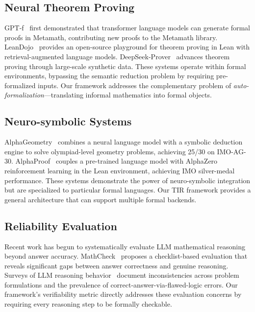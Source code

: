 \documentclass[11pt,a4paper]{article}
\begin{document}
\subsection{Neural Theorem Proving}

GPT-f~\cite{polu2020generative} first demonstrated that transformer language models can generate formal proofs in Metamath, contributing new proofs to the Metamath library. LeanDojo~\cite{yang2023leandojo} provides an open-source playground for theorem proving in Lean with retrieval-augmented language models. DeepSeek-Prover~\cite{deepseek2024prover} advances theorem proving through large-scale synthetic data. These systems operate within formal environments, bypassing the semantic reduction problem by requiring pre-formalized inputs. Our framework addresses the complementary problem of \textit{auto-formalization}---translating informal mathematics into formal objects.

\subsection{Neuro-symbolic Systems}

AlphaGeometry~\cite{trinh2024solving} combines a neural language model with a symbolic deduction engine to solve olympiad-level geometry problems, achieving 25/30 on IMO-AG-30. AlphaProof~\cite{hubert2025alphaproof} couples a pre-trained language model with AlphaZero reinforcement learning in the Lean environment, achieving IMO silver-medal performance. These systems demonstrate the power of neuro-symbolic integration but are specialized to particular formal languages. Our TIR framework provides a general architecture that can support multiple formal backends.

\subsection{Reliability Evaluation}

Recent work has begun to systematically evaluate LLM mathematical reasoning beyond answer accuracy. MathCheck~\cite{liang2024mathcheck} proposes a checklist-based evaluation that reveals significant gaps between answer correctness and genuine reasoning. Surveys of LLM reasoning behavior~\cite{huang2024survey} document inconsistencies across problem formulations and the prevalence of correct-answer-via-flawed-logic errors. Our framework's verifiability metric directly addresses these evaluation concerns by requiring every reasoning step to be formally checkable.
\end{document}

